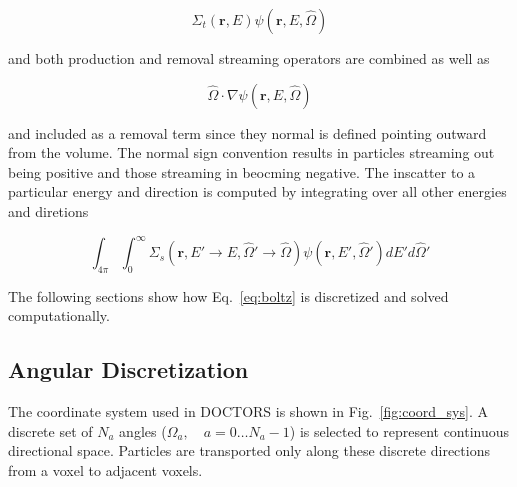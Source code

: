 \begin{equation}
\Sigma_t(\boldsymbol{r}, E) \psi(\boldsymbol{r}, E, \hat{\Omega})
\end{equation}

\noindent
and both production and removal streaming operators are combined as well as

\begin{equation}
\hat{\Omega} \cdot \nabla \psi(\boldsymbol{r}, E, \hat{\Omega})
\end{equation}

\noindent
and included as a removal term since they normal is defined pointing outward from the volume. The normal sign convention results in particles streaming out being positive and those streaming in beocming negative. The inscatter to a particular energy and direction is computed by integrating over all other energies and diretions

\begin{equation}
\int_{4\pi}^{} \int_{0}^{\infty} \Sigma_s(\boldsymbol{r}, E' \rightarrow E, \hat{\Omega}' \rightarrow \hat{\Omega}) \psi(\boldsymbol{r}, E', \hat{\Omega}') dE' d\hat{\Omega}'
\end{equation}

The following sections show how Eq.~\ref{eq:boltz} is discretized and solved computationally.

\subsection{Angular Discretization}
The coordinate system used in DOCTORS is shown in Fig.~\ref{fig:coord_sys}. A discrete set of $N_a$ angles ($\Omega_{a}, \quad a = 0 \ldots N_a-1$) is selected to represent continuous directional space. Particles are transported only along these discrete directions from a voxel to adjacent voxels.

